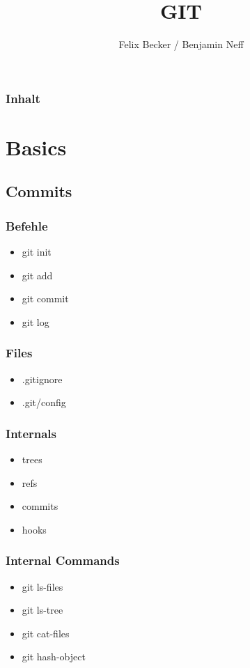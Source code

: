 \documentclass{beamer}
\title{GIT}
\subtitle{}
\institute[Tondorf]{Tondorf 2012}
\author[F. Becker/B. Neff]{
	Felix Becker / Benjamin Neff
}
\begin{document}
	\begin{frame}
		\titlepage
	\end{frame}

	\begin{frame}
		\frametitle{Inhalt}
		\setcounter{tocdepth}{1}
		\tableofcontents
	\end{frame}
	
	\section{Basics}
	
		\subsection{Commits}
			
			\begin{frame}
				\frametitle{Befehle}

				\begin{itemize}
					\item{git init}
					\item{git add}
					\item{git commit}
					\item{git log}
				\end{itemize}
			\end{frame}

			\begin{frame}
				\frametitle{Files}

				\begin{itemize}
					\item{.gitignore}
					\item{.git/config}
				\end{itemize}
			\end{frame}

			\begin{frame}
				\frametitle{Internals}

				\begin{itemize}
					\item{trees}
					\item{refs}
					\item{commits}
					\item{hooks}
				\end{itemize}
			\end{frame}

			\begin{frame}
				\frametitle{Internal Commands}

				\begin{itemize}
					\item{git ls-files}
					\item{git ls-tree}
					\item{git cat-files}
					\item{git hash-object}
				\end{itemize}
			\end{frame}
\end{document}
